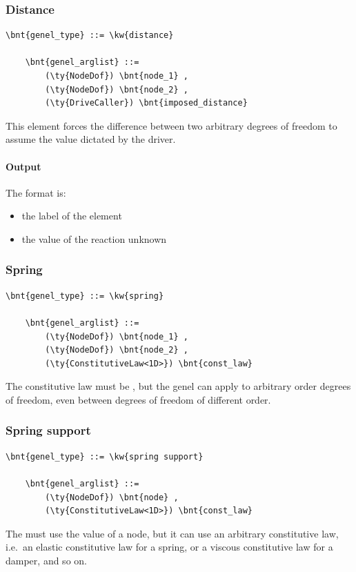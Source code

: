 \subsubsection{Distance}
\label{sec:EL:GENEL:DISTANCE}
\begin{Verbatim}[commandchars=\\\{\}]
    \bnt{genel_type} ::= \kw{distance}

    \bnt{genel_arglist} ::=
        (\ty{NodeDof}) \bnt{node_1} ,
        (\ty{NodeDof}) \bnt{node_2} ,
        (\ty{DriveCaller}) \bnt{imposed_distance}
\end{Verbatim}
This element forces the difference between two arbitrary degrees of freedom
to assume the value dictated by the driver.

\paragraph{Output}
The format is:
\begin{itemize}
    \item the label of the element
    \item the value of the reaction unknown
\end{itemize}
  
\subsubsection{Spring}
\label{sec:EL:GENEL:SPRING}
\begin{Verbatim}[commandchars=\\\{\}]
    \bnt{genel_type} ::= \kw{spring}

    \bnt{genel_arglist} ::=
        (\ty{NodeDof}) \bnt{node_1} ,
        (\ty{NodeDof}) \bnt{node_2} ,
        (\ty{ConstitutiveLaw<1D>}) \bnt{const_law}
\end{Verbatim}
The constitutive law must be , but the 
genel can apply to arbitrary order degrees of freedom, even between degrees 
of freedom of different order.

\subsubsection{Spring support}
\label{sec:EL:GENEL:SPRING-SUPPORT}
\begin{Verbatim}[commandchars=\\\{\}]
    \bnt{genel_type} ::= \kw{spring support}

    \bnt{genel_arglist} ::=
        (\ty{NodeDof}) \bnt{node} ,
        (\ty{ConstitutiveLaw<1D>}) \bnt{const_law}
\end{Verbatim}
The  must use the  value of a 
 node, but it can use an arbitrary constitutive law,
i.e.\ an elastic constitutive law for a spring, or a viscous
constitutive law for a damper, and so on.

